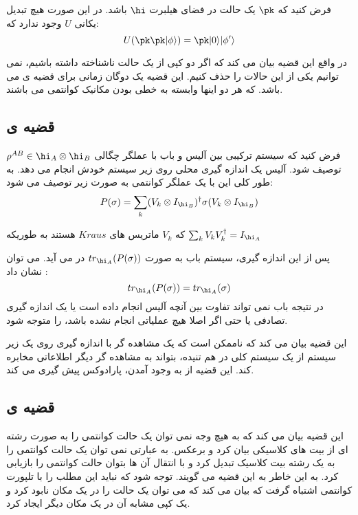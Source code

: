 فرض کنید که 
$\pk$
یک حالت در فضای هیلبرت
$\hi$
باشد. در این صورت هیچ تبدیل یکانی 
$U$
وجود ندارد که:
\begin{equation}
	U(\pk \pk |\phi\rangle) = \pk |0\rangle |\phi '\rangle
\end{equation}


در واقع این قضیه بیان می کند که اگر دو کپی از یک حالت ناشناخته داشته باشیم، نمی توانیم یکی از این حالات را حذف کنیم. این قضیه یک دوگان زمانی برای قضیه ی 
می باشد. که هر دو اینها وابسته به خطی بودن مکانیک کوانتمی می باشند.

\subsection{قضیه ی }

فرض کنید که سیستم ترکیبی بین آلیس 
و
باب
با عملگر چگالی 
$\rho^{AB} \in \hi_A \otimes \hi_B$
توصیف شود. آلیس یک اندازه گیری محلی روی زیر سیستم خودش انجام می دهد. به طور کلی این با یک عملگر کوانتمی به صورت زیر توصیف می شود:
\begin{equation}
	P(\sigma) = \sum_k(V_k \otimes I_{\hi_B})^\dagger \sigma (V_k \otimes I_{\hi_B}) 
\end{equation}

که 
$V_k$
ماتریس های 
$Kraus$
هستند به طوریکه
$\sum_k V_k V_k^\dagger = I_{\hi_A}$

پس از این اندازه گیری، سیستم باب به صورت 
$tr_{\hi_A} (P(\sigma))$
 در می آید. می توان نشان داد
 \cite{wilde}
 : 
 \begin{equation}
 	tr_{\hi_A} (P(\sigma)) = tr_{\hi_A} (\sigma)
 \end{equation}
 در نتیجه باب نمی تواند تفاوت بین آنچه آلیس انجام داده است یا یک اندازه گیری تصادفی یا حتی اگر اصلا هیچ عملیاتی انجام نشده باشد، را متوجه شود.

این قضیه بیان می کند که ناممکن است که  یک مشاهده گر  با اندازه گیری روی یک زیر سیستم از یک سیستم کلی در هم تنیده، بتواند به مشاهده گر دیگر اطلاعاتی مخابره کند. این قضیه از به وجود آمدن، پارادوکس
پیش گیری می کند.


\subsection{قضیه ی }

این قضیه بیان می کند که به هیچ وجه نمی توان یک حالت کوانتمی را به صورت رشته ای از بیت های کلاسیکی بیان کرد و برعکس. به عبارتی نمی توان یک حالت کوانتمی را به یک رشته بیت کلاسیک تبدیل کرد و با انتقال آن ها بتوان حالت کوانتمی را بازیابی کرد. به این خاطر به این قضیه 
می گویند. توجه شود که نباید این مطلب را با تلپورت کوانتمی
اشتباه گرفت که بیان می کند که می توان یک حالت را در یک مکان نابود کرد و یک کپی مشابه آن در یک مکان دیگر ایجاد کرد.


